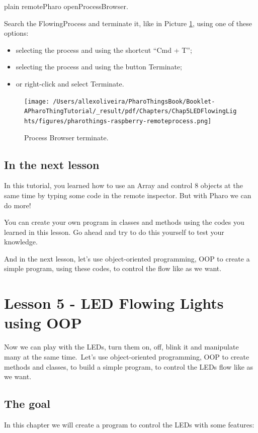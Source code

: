 \documentclass[10pt,twoside,english]{_support/latex/sbabook/sbabook}
\begin{document}
\begin{displaycode}{plain}
remotePharo openProcessBrowser.
\end{displaycode}

Search the FlowingProcess and terminate it, like in Picture \ref{Inspector8LEDsfinal}, using one of these options:

\begin{itemize}
\item selecting the process and using the shortcut “Cmd + T”;
\item selecting the process and using the button Terminate;
\item or right-click and select Terminate.
\end{itemize}


\begin{figure}

\begin{center}
\texttt{[image: /Users/allexoliveira/PharoThingsBook/Booklet-APharoThingTutorial/\_result/pdf/Chapters/Chap5LEDFlowingLights/figures/pharothings-raspberry-remoteprocess.png]}\caption{Process Browser terminate.\label{Inspector8LEDsfinal}}\end{center}
\end{figure}

\section{In the next lesson}
In this tutorial, you learned how to use an Array and control 8 objects at the same time by typing some code in the remote inspector. But with Pharo we can do more!

You can create your own program in classes and methods using the codes you learned in this lesson. Go ahead and try to do this yourself to test your knowledge.

And in the next lesson, let’s use object-oriented programming, OOP to create a simple program, using these codes, to control the flow like as we want.
\chapter{Lesson 5 - LED Flowing Lights using OOP}
Now we can play with the LEDs, turn them on, off, blink it and manipulate many at the same time. Let’s use object-oriented programming, OOP to create methods and classes, to build a simple program, to control the LEDs flow like as we want.
\section{The goal}
In this chapter we will create a program to control the LEDs with some features:
\end{document}
